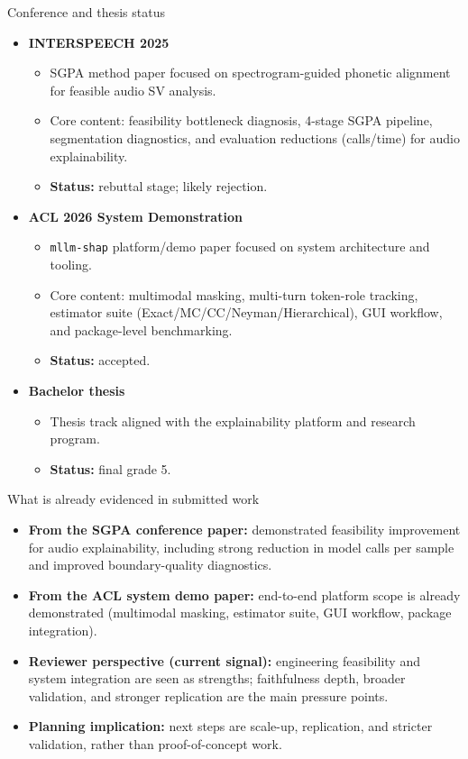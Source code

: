 \documentclass[aspectratio=169]{beamer}
\begin{document}
\begin{frame}{Conference and thesis status}
  \begin{itemize}
    \item \textbf{INTERSPEECH 2025}
      \begin{itemize}
        \item SGPA method paper focused on spectrogram-guided phonetic alignment for feasible audio SV analysis.
        \item Core content: feasibility bottleneck diagnosis, 4-stage SGPA pipeline, segmentation diagnostics, and evaluation reductions (calls/time) for audio explainability.
        \item \textbf{Status:} rebuttal stage; likely rejection.
      \end{itemize}
    \item \textbf{ACL 2026 System Demonstration}
      \begin{itemize}
        \item \texttt{mllm-shap} platform/demo paper focused on system architecture and tooling.
        \item Core content: multimodal masking, multi-turn token-role tracking, estimator suite (Exact/MC/CC/Neyman/Hierarchical), GUI workflow, and package-level benchmarking.
        \item \textbf{Status:} accepted.
      \end{itemize}
    \item \textbf{Bachelor thesis}
      \begin{itemize}
        \item Thesis track aligned with the explainability platform and research program.
        \item \textbf{Status:} final grade 5.
      \end{itemize}
  \end{itemize}
\end{frame}

\begin{frame}{What is already evidenced in submitted work}
  \begin{itemize}
    \item \textbf{From the SGPA conference paper:} demonstrated feasibility improvement for audio explainability, including strong reduction in model calls per sample and improved boundary-quality diagnostics.
    \item \textbf{From the ACL system demo paper:} end-to-end platform scope is already demonstrated (multimodal masking, estimator suite, GUI workflow, package integration).
    \item \textbf{Reviewer perspective (current signal):} engineering feasibility and system integration are seen as strengths; faithfulness depth, broader validation, and stronger replication are the main pressure points.
    \item \textbf{Planning implication:} next steps are scale-up, replication, and stricter validation, rather than proof-of-concept work.
  \end{itemize}
\end{frame}
\end{document}
